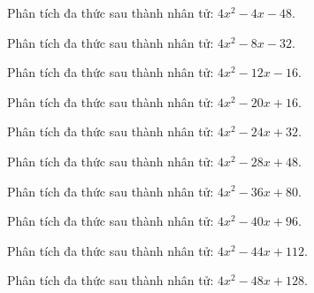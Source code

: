 \begin{bt}
	Phân tích đa thức sau thành nhân tử: $4 x^2 - 4 x - 48$.
\end{bt}
\begin{bt}
	Phân tích đa thức sau thành nhân tử: $4 x^2 - 8 x - 32$.
\end{bt}
\begin{bt}
	Phân tích đa thức sau thành nhân tử: $4 x^2 - 12 x - 16$.
\end{bt}
\begin{bt}
	Phân tích đa thức sau thành nhân tử: $4 x^2 - 20 x + 16$.
\end{bt}
\begin{bt}
	Phân tích đa thức sau thành nhân tử: $4 x^2 - 24 x + 32$.
\end{bt}
\begin{bt}
	Phân tích đa thức sau thành nhân tử: $4 x^2 - 28 x + 48$.
\end{bt}
\begin{bt}
	Phân tích đa thức sau thành nhân tử: $4 x^2 - 36 x + 80$.
\end{bt}
\begin{bt}
	Phân tích đa thức sau thành nhân tử: $4 x^2 - 40 x + 96$.
\end{bt}
\begin{bt}
	Phân tích đa thức sau thành nhân tử: $4 x^2 - 44 x + 112$.
\end{bt}
\begin{bt}
	Phân tích đa thức sau thành nhân tử: $4 x^2 - 48 x + 128$.
\end{bt}
